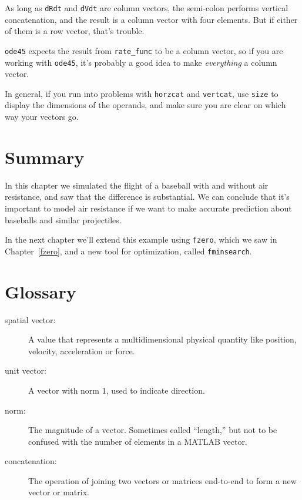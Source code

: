 As long as {\tt dRdt} and {\tt dVdt} are column vectors,
the semi-colon performs vertical concatenation, and the result is
a column vector with four elements.  But if either of them is a
row vector, that's trouble.


{\tt ode45} expects the result from \verb"rate_func" to be a
column vector, so if you are working with {\tt ode45}, it's
probably a good idea to make {\em everything} a column vector.

In general, if you run into problems with {\tt horzcat} and
{\tt vertcat}, use {\tt size} to display the dimensions of the operands,
and make sure you are clear on which way your vectors go.

\section{Summary}

In this chapter we simulated the flight of a baseball with and without air resistance, and saw that the difference is substantial.
We can conclude that it's important to model air resistance if we want to make accurate prediction about baseballs and similar projectiles.

In the next chapter we'll extend this example using {\tt fzero}, which we saw in Chapter~\ref{fzero}, and a new tool for optimization, called {\tt fminsearch}.


\section{Glossary}

\begin{description}

\item[spatial vector:] A value that represents a
multidimensional physical quantity like position, velocity,
acceleration or force.

\item[unit vector:] A vector with norm 1, used to indicate
direction.

\item[norm:] The magnitude of a vector.  Sometimes called ``length,''
but not to be confused with the number of elements in a MATLAB
vector.

\item[concatenation:] The operation of joining two vectors or matrices end-to-end to
form a new vector or matrix.

\end{description}


